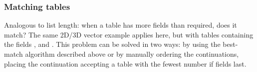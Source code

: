 \subsubsection{Matching tables}
Analogous to list length: when a table has more fields than required, does it match? The same 2D/3D vector example applies here, but with tables containing the fields ,  and .
This problem can be solved in two ways: by using the best-match algorithm described above or by manually ordering the continuations, placing the continuation accepting a table with the fewest number if fields last.
